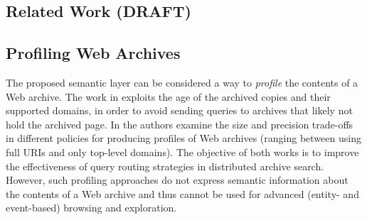 \documentclass[runningheads,a4paper]{libtex/llncs}
\begin{document}
\subsection{Related Work (DRAFT)}
\label{rw}

\subsection*{Profiling Web Archives}

The proposed semantic layer can be considered a way to {\em profile}
the contents of a Web archive.
The work in \cite{alsum2014profiling} exploits the age of the archived copies
and their supported domains,
in order to avoid sending queries to archives that likely not hold the archived page.
In \cite{alam2015web} the authors examine the size and precision
trade-offs in different policies for producing profiles of Web archives
(ranging between using full URIs and only top-level domains).
The objective of both works is to improve the effectiveness of
query routing strategies in distributed archive search.
However, such profiling approaches do not express semantic information about the
contents of a Web archive and thus cannot be used
for advanced (entity- and event-based) browsing and exploration.
\end{document}
